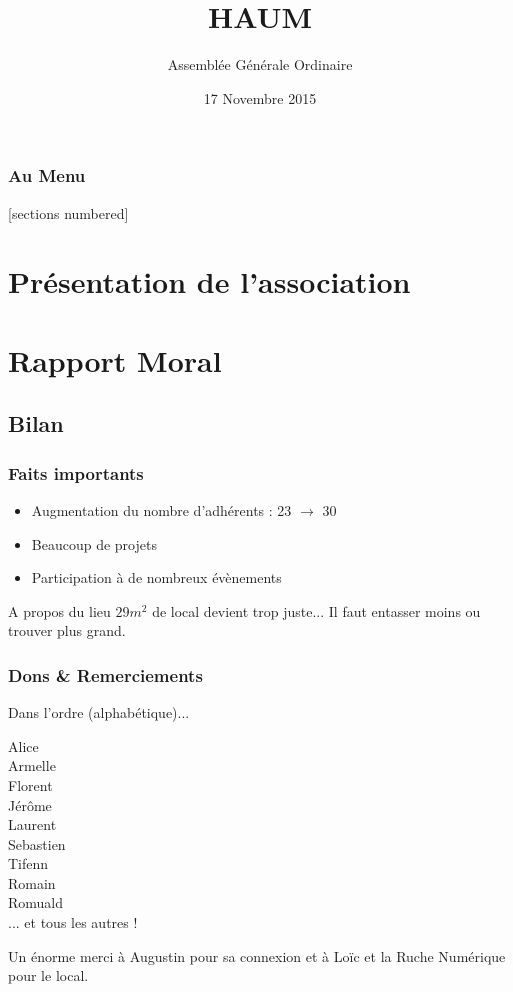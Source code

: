 \documentclass[10pt, compress]{beamer}
\title{HAUM}
\subtitle{Assemblée Générale Ordinaire}
\date{17 Novembre 2015}
\begin{document}
\maketitle

\begin{frame}
	\frametitle{Au Menu}
	[sections numbered]
	\tableofcontents
\end{frame}

\section{Présentation de l'association}

\section{Rapport Moral}

\subsection{Bilan}

\begin{frame}
	\frametitle{Faits importants}

	\begin{itemize}
		\item Augmentation du nombre d'adhérents : 23 $\rightarrow$ 30
		\item Beaucoup de projets
		\item Participation à de nombreux évènements
	\end{itemize}

	\pause
	\begin{block}{A propos du lieu}
		$29m^2$ de local devient trop juste... Il faut entasser moins ou trouver plus grand.
	\end{block}
\end{frame}

\begin{frame}
	\frametitle{Dons \& Remerciements}
	Dans l'ordre \pause(alphabétique)...

	\pause

	\begin{center}
		\pause Alice\\
		\pause Armelle\\
		\pause Florent\\
		\pause Jérôme\\
		\pause Laurent\\
		\pause Sebastien\\
		\pause Tifenn\\
		\pause Romain\\
		\pause Romuald\\
		\pause ... et tous les autres !
	\end{center}

	\pause

	Un énorme merci à \alert{Augustin} pour sa connexion et à \alert{Loïc et la Ruche Numérique} pour le local.
\end{frame}
\end{document}
